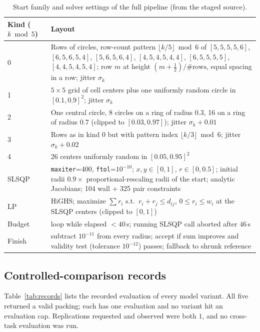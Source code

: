 \documentclass{article} %
\begin{document}
\begin{table}[h]
\centering
\caption{Start family and solver settings of the full pipeline (from the staged source).}
\label{tab:starts}
\small
\begin{tabular}{p{}p{}}
\toprule
Kind ($k \bmod 5$) & Layout \\
\midrule
0 & Rows of circles, row-count pattern $\lfloor k/5\rfloor \bmod 6$ of $[5,5,5,5,6]$, $[6,5,6,5,4]$, $[5,6,5,6,4]$, $[4,5,4,5,4,4]$, $[6,5,5,5,5]$, $[4,4,5,4,5,4]$; row $m$ at height $(m+\tfrac12)/\#\text{rows}$, equal spacing in a row; jitter $\sigma_k$ \\
1 & $5\times 5$ grid of cell centers plus one uniformly random circle in $[0.1,0.9]^2$; jitter $\sigma_k$ \\
2 & One central circle, 8 circles on a ring of radius $0.3$, 16 on a ring of radius $0.7$ (clipped to $[0.03,0.97]$); jitter $\sigma_k+0.01$ \\
3 & Rows as in kind 0 but with pattern index $\lfloor k/3\rfloor \bmod 6$; jitter $\sigma_k+0.02$ \\
4 & 26 centers uniformly random in $[0.05,0.95]^2$ \\
\midrule
SLSQP & \texttt{maxiter}=400, \texttt{ftol}=$10^{-10}$; $x,y\in[0,1]$, $r\in[0,0.5]$; initial radii $0.9\times$ proportional-rescaling radii of the start; analytic Jacobians; 104 wall + 325 pair constraints \\
LP & HiGHS; maximize $\sum r_i$ s.t.\ $r_i+r_j\le d_{ij}$, $0\le r_i\le w_i$ at the SLSQP centers (clipped to $[0,1]$) \\
Budget & loop while elapsed $<40$\,s; running SLSQP call aborted after $46$\,s \\
Finish & subtract $10^{-11}$ from every radius; accept if sum improves and validity test (tolerance $10^{-12}$) passes; fallback to shrunk reference \\
\bottomrule
\end{tabular}
\end{table}

\subsection{Controlled-comparison records}
Table~\ref{tab:records} lists the recorded evaluation of every model variant. All five returned a valid packing; each has one evaluation and no variant hit an evaluation cap. Replications requested and observed were both $1$, and no cross-task evaluation was run.
\end{document}
